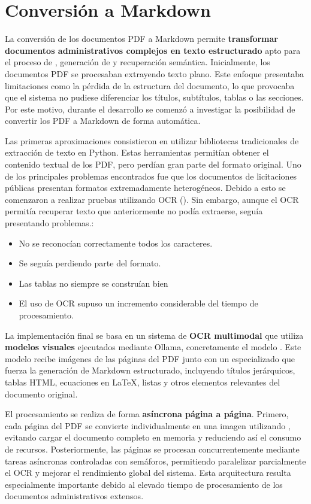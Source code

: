 \section{Conversión a Markdown}

La conversión de los documentos PDF a Markdown permite \textbf{transformar documentos administrativos complejos en texto estructurado} apto para el proceso de , generación de  y recuperación semántica. Inicialmente, los documentos PDF se procesaban extrayendo texto plano. Este enfoque presentaba limitaciones como la pérdida de la estructura del documento, lo que provocaba que el sistema no pudiese diferenciar los títulos, subtítulos, tablas o las secciones. Por este motivo, durante el desarrollo se comenzó a investigar la posibilidad de convertir los PDF a Markdown de forma automática.

Las primeras aproximaciones consistieron en utilizar bibliotecas tradicionales de extracción de texto en Python. Estas herramientas permitían obtener el contenido textual de los PDF, pero perdían gran parte del formato original. Uno de los principales problemas encontrados fue que los documentos de licitaciones públicas presentan formatos extremadamente heterogéneos. Debido a esto se comenzaron a realizar pruebas utilizando OCR (). Sin embargo, aunque el OCR permitía recuperar texto que anteriormente no podía extraerse, seguía presentando problemas.:
\begin{itemize}
	\item No se reconocían correctamente todos los caracteres.
	\item Se seguía perdiendo parte del formato.
	\item Las tablas no siempre se construían bien
	\item El uso de OCR supuso un incremento considerable del tiempo de procesamiento.
\end{itemize}

La implementación final se basa en un sistema de \textbf{OCR multimodal} que utiliza \textbf{modelos visuales} ejecutados mediante Ollama, concretamente el modelo . Este modelo recibe imágenes de las páginas del PDF junto con un  especializado que fuerza la generación de Markdown estructurado, incluyendo títulos jerárquicos, tablas HTML, ecuaciones en \LaTeX{}, listas y otros elementos relevantes del documento original.

El procesamiento se realiza de forma \textbf{asíncrona página a página}. Primero, cada página del PDF se convierte individualmente en una imagen utilizando , evitando cargar el documento completo en memoria y reduciendo así el consumo de recursos. Posteriormente, las páginas se procesan concurrentemente mediante tareas asíncronas controladas con semáforos, permitiendo paralelizar parcialmente el OCR y mejorar el rendimiento global del sistema. Esta arquitectura resulta especialmente importante debido al elevado tiempo de procesamiento de los documentos administrativos extensos.

